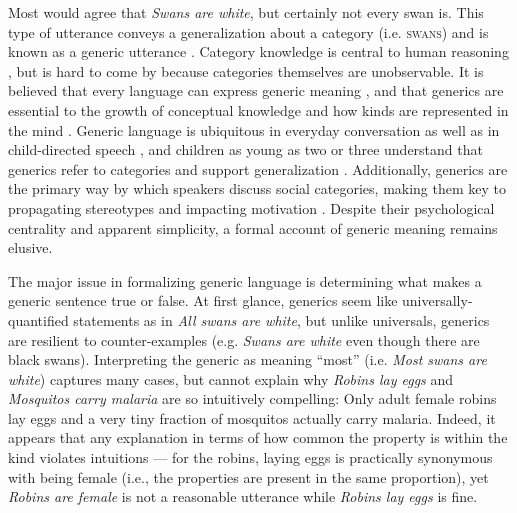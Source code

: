 \documentclass[12pt,letterpaper]{article}
\begin{document}
\newpage

Most would agree that \emph{Swans are white}, but certainly not every swan is.
This type of utterance conveys a generalization about a category (i.e. \textsc{swans}) and is known as a generic utterance \cite{Carlson1977,Leslie2008}.
Category knowledge is central to human reasoning \cite{Markman1989}, but is hard to come by because categories themselves are unobservable.
It is believed that every language can express generic meaning \cite{Behrens2005,Carlson1995}, and that generics are essential to the growth of conceptual knowledge \cite{Gelman2004} and how kinds are represented in the mind \cite{Leslie2008}.
Generic language is ubiquitous in everyday conversation as well as in child-directed speech \cite{Gelman2008}, and children as young as two or three understand that generics refer to categories and support generalization \cite{Cimpian2008}.
Additionally, generics are the primary way by which speakers discuss social categories, making them key to propagating stereotypes \cite{GelmanEtAl2004,Rhodes2012,Leslie2015} and impacting motivation \cite{Cimpian2010motivation}.
Despite their psychological centrality and apparent simplicity, a formal account of generic meaning remains elusive.

The major issue in formalizing generic language is determining what makes a generic sentence true or false.
At first glance, generics seem like universally-quantified statements as in \emph{All swans are white}, but unlike universals, generics are resilient to counter-examples (e.g. \emph{Swans are white} even though there are black swans). 
Interpreting the generic as meaning ``most'' (i.e. \emph{Most swans are white}) captures many cases, but cannot explain why \emph{Robins lay eggs} and \emph{Mosquitos carry malaria} are so intuitively compelling: Only adult female robins lay eggs and a very tiny fraction of mosquitos actually carry malaria.
Indeed, it appears that any explanation in terms of how common the property is within the kind violates intuitions --- for the robins, laying eggs is practically synonymous with being female (i.e., the properties are present in the same proportion), yet \emph{Robins are female} is not a reasonable utterance while \emph{Robins lay eggs} is fine.
\end{document}
